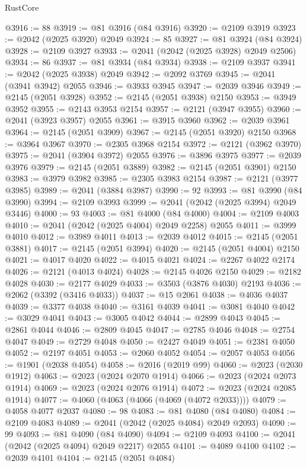 \begin{lexlean}{RustCore}
\begin{coremodule}
@3916 := 88
@3919 := @81 @3916 (@84 @3916)
@3920 := @2109 @3919
@3923 := @2042 (@2025 @3920) @2049
@3924 := 85
@3927 := @81 @3924 (@84 @3924)
@3928 := @2109 @3927
@3933 := @2041 (@2042 (@2025 @3928) @2049 @2506)
@3934 := 86
@3937 := @81 @3934 (@84 @3934)
@3938 := @2109 @3937
@3941 := @2042 (@2025 @3938) @2049
@3942 := @2092 @3769
@3945 := @2041 (@3941 @3942) @2055
@3946 := @3933 @3945
@3947 := @2039 @3946
@3949 := @2145 (@2051 @3928)
@3952 := @2145 (@2051 @3938) @2150
@3953 := @3949 @3952
@3955 := @2143 @3953 @2154
@3957 := @2121 (@3947 @3955)
@3960 := @2041 (@3923 @3957) @2055
@3961 := @3915 @3960
@3962 := @2039 @3961
@3964 := @2145 (@2051 @3909)
@3967 := @2145 (@2051 @3920) @2150
@3968 := @3964 @3967
@3970 := @2305 @3968 @2154
@3972 := @2121 (@3962 @3970)
@3975 := @2041 (@3904 @3972) @2055
@3976 := @3896 @3975
@3977 := @2039 @3976
@3979 := @2145 (@2051 @3889)
@3982 := @2145 (@2051 @3901) @2150
@3983 := @3979 @3982
@3985 := @2305 @3983 @2154
@3987 := @2121 (@3977 @3985)
@3989 := @2041 (@3884 @3987)
@3990 := 92
@3993 := @81 @3990 (@84 @3990)
@3994 := @2109 @3993
@3999 := @2041 (@2042 (@2025 @3994) @2049 @3446)
@4000 := 93
@4003 := @81 @4000 (@84 @4000)
@4004 := @2109 @4003
@4010 := @2041 (@2042 (@2025 @4004) @2049 @2258) @2055
@4011 := @3999 @4010
@4012 := @3989 @4011
@4013 := @2039 @4012
@4015 := @2145 (@2051 @3881)
@4017 := @2145 (@2051 @3994)
@4020 := @2145 (@2051 @4004) @2150
@4021 := @4017 @4020
@4022 := @4015 @4021
@4024 := @2267 @4022 @2174
@4026 := @2121 (@4013 @4024)
@4028 := @2145 @4026 @2150
@4029 := @2182 @4028
@4030 := @2177 @4029
@4033 := @3503 (@3876 @4030) @2193
@4036 := @2062 (@3392 (@3416 @4033))
@4037 := @15 @2061
@4038 := @4036 @4037
@4039 := @3377 @4038
@4040 := @3161 @4039
@4041 := @3081 @4040
@4042 := @3029 @4041
@4043 := @3005 @4042
@4044 := @2899 @4043
@4045 := @2861 @4044
@4046 := @2809 @4045
@4047 := @2785 @4046
@4048 := @2754 @4047
@4049 := @2729 @4048
@4050 := @2427 @4049
@4051 := @2381 @4050
@4052 := @2197 @4051
@4053 := @2060 @4052
@4054 := @2057 @4053
@4056 := @1901 (@2038 @4054)
@4058 := @2016 (@2019 @99)
@4060 := @2023 (@2030 @1912)
@4063 := @2023 (@2024 @2070 @1914)
@4066 := @2023 (@2024 @2073 @1914)
@4069 := @2023 (@2024 @2076 @1914)
@4072 := @2023 (@2024 @2085 @1914)
@4077 := @4060 (@4063 (@4066 (@4069 (@4072 @2033))))
@4079 := @4058 @4077 @2037
@4080 := 98
@4083 := @81 @4080 (@84 @4080)
@4084 := @2109 @4083
@4089 := @2041 (@2042 (@2025 @4084) @2049 @2093)
@4090 := 99
@4093 := @81 @4090 (@84 @4090)
@4094 := @2109 @4093
@4100 := @2041 (@2042 (@2025 @4094) @2049 @2217) @2055
@4101 := @4089 @4100
@4102 := @2039 @4101
@4104 := @2145 (@2051 @4084)

\end{coremodule}
\end{lexlean}
